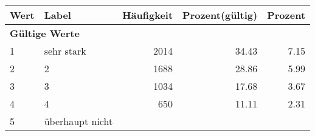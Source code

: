      \begin{longtable}{lXrrr}
     \toprule
     \textbf{Wert} & \textbf{Label} & \textbf{Häufigkeit} & \textbf{Prozent(gültig)} & \textbf{Prozent} \\
     \endhead
     \midrule
     \multicolumn{5}{l}{\textbf{Gültige Werte}}\\

     1 &
     \multicolumn{1}{X}{ sehr stark   } &


       \num{2014} &
       \num[round-mode=places,round-precision=2]{34.43} &
         \num[round-mode=places,round-precision=2]{7.15} \\

     2 &
     \multicolumn{1}{X}{ 2   } &


       \num{1688} &
       \num[round-mode=places,round-precision=2]{28.86} &
         \num[round-mode=places,round-precision=2]{5.99} \\

     3 &
     \multicolumn{1}{X}{ 3   } &


       \num{1034} &
       \num[round-mode=places,round-precision=2]{17.68} &
         \num[round-mode=places,round-precision=2]{3.67} \\

     4 &
     \multicolumn{1}{X}{ 4   } &


       \num{650} &
       \num[round-mode=places,round-precision=2]{11.11} &
         \num[round-mode=places,round-precision=2]{2.31} \\

     5 &
     \multicolumn{1}{X}{ überhaupt nicht   } &



\end{longtable}
